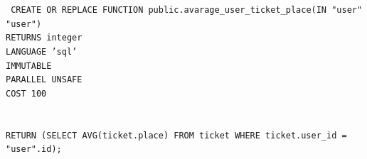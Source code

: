 \texttt{
    CREATE OR REPLACE FUNCTION public.avarage\_user\_ticket\_place(IN "user" "user") \\
    RETURNS integer \\
    LANGUAGE 'sql' \\
    IMMUTABLE \\
    PARALLEL UNSAFE \\
    COST 100 \\
    \\
    \\
    RETURN (SELECT AVG(ticket.place) FROM ticket WHERE ticket.user\_id = "user".id); \\
}